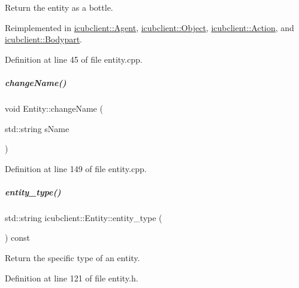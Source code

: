 Return the entity as a bottle. 



Reimplemented in \hyperlink{group__icubclient__representations_a7969e73f3ee81ba44e36211807666033}{icubclient\+::\+Agent}, \hyperlink{group__icubclient__representations_a60acd95fa583dc758f2b76e1968a7ea2}{icubclient\+::\+Object}, \hyperlink{group__icubclient__representations_a55fccb7922381a3d9a6657af902368b9}{icubclient\+::\+Action}, and \hyperlink{group__icubclient__representations_acacf4d8971e54092fae9f3278f219562}{icubclient\+::\+Bodypart}.



Definition at line 45 of file entity.\+cpp.

\mbox{\label{group__icubclient__representations_a6dee4e872381a74a59d35f5f72710364}} 
\subparagraph{\texorpdfstring{change\+Name()}{changeName()}}
{\footnotesize\ttfamily void Entity\+::change\+Name (\begin{DoxyParamCaption}\item[{std\+::string}]{s\+Name }\end{DoxyParamCaption})\hspace{0.3cm}{\ttfamily [protected]}}



Definition at line 149 of file entity.\+cpp.

\mbox{\label{group__icubclient__representations_a1795021c80c136ab0356d9aa58027c08}} 
\subparagraph{\texorpdfstring{entity\+\_\+type()}{entity\_type()}}
{\footnotesize\ttfamily std\+::string icubclient\+::\+Entity\+::entity\+\_\+type (\begin{DoxyParamCaption}{ }\end{DoxyParamCaption}) const\hspace{0.3cm}{\ttfamily [inline]}}



Return the specific type of an entity. 



Definition at line 121 of file entity.\+h.

